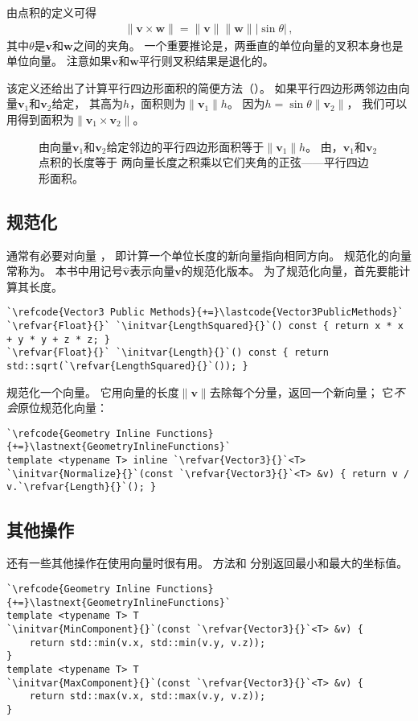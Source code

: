 由点积的定义可得
\begin{align}\label{eq:2.2}
    \|\bm v\times\bm w\|=\|\bm v\|\|\bm w\||\sin\theta|\, ,
\end{align}
其中$\theta$是$\bm v$和$\bm w$之间的夹角。
一个重要推论是，两垂直的单位向量的叉积本身也是单位向量。
注意如果$\bm v$和$\bm w$平行则叉积结果是退化的。

该定义还给出了计算平行四边形面积的简便方法（）。
如果平行四边形两邻边由向量$\bm v_1$和$\bm v_2$给定，
其高为$h$，面积则为$\|\bm v_1\|h$。
因为$h=\sin\theta\|\bm v_2\|$，
我们可以用得到面积为$\|\bm v_1\times\bm v_2\|$。
\begin{figure}[htbp]
    \centering
    \caption{由向量$\bm v_1$和$\bm v_2$给定邻边的平行四边形面积等于$\|\bm v_1\|h$。
        由\protect{}，$\bm v_1$和$\bm v_2$点积的长度等于
        两向量长度之积乘以它们夹角的正弦——平行四边形面积。}
    \label{fig:2.5}
\end{figure}

\subsection{规范化}\label{sub:规范化}
通常有必要对向量
，
即计算一个单位长度的新向量指向相同方向。
规范化的向量常称为。
本书中用记号$\hat{\bm v}$表示向量$\bm v$的规范化版本。
为了规范化向量，首先要能计算其长度。
\begin{lstlisting}
`\refcode{Vector3 Public Methods}{+=}\lastcode{Vector3PublicMethods}`
`\refvar{Float}{}` `\initvar{LengthSquared}{}`() const { return x * x + y * y + z * z; }
`\refvar{Float}{}` `\initvar{Length}{}`() const { return std::sqrt(`\refvar{LengthSquared}{}`()); }
\end{lstlisting}

规范化一个向量。
它用向量的长度$\|\bm v\|$去除每个分量，返回一个新向量；
它\emph{不会}原位规范化向量：
\begin{lstlisting}
`\refcode{Geometry Inline Functions}{+=}\lastnext{GeometryInlineFunctions}`
template <typename T> inline `\refvar{Vector3}{}`<T>
`\initvar{Normalize}{}`(const `\refvar{Vector3}{}`<T> &v) { return v / v.`\refvar{Length}{}`(); }
\end{lstlisting}

\subsection{其他操作}\label{sub:其他操作}
还有一些其他操作在使用向量时很有用。
方法和
分别返回最小和最大的坐标值。
\begin{lstlisting}
`\refcode{Geometry Inline Functions}{+=}\lastnext{GeometryInlineFunctions}`
template <typename T> T
`\initvar{MinComponent}{}`(const `\refvar{Vector3}{}`<T> &v) {
    return std::min(v.x, std::min(v.y, v.z));
}
template <typename T> T
`\initvar{MaxComponent}{}`(const `\refvar{Vector3}{}`<T> &v) {
    return std::max(v.x, std::max(v.y, v.z));
}
\end{lstlisting}

